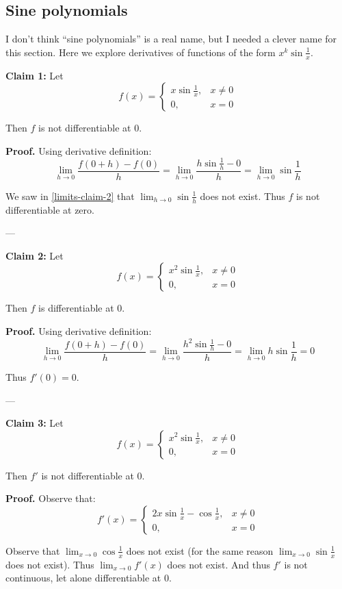 \subsection{Sine polynomials}\label{subsec-sine-poly}

I don't think ``sine polynomials'' is a real name, but I needed a
clever name for this section. Here we explore derivatives of functions
of the form $x^k\sin \frac{1}{x}$.

\vs

\textbf{Claim 1:} Let
\[f(x)=\begin{cases}
  x\sin \frac{1}{x},&x\neq0\\
  0,&x=0
\end{cases}\]

Then $f$ is not differentiable at $0$.

\vs

\textbf{Proof.} Using derivative definition:
\[\lim_{h\to0}\frac{f(0+h)-f(0)}{h}=\lim_{h\to0}\frac{h\sin
    \frac{1}{h}-0}{h}=\lim_{h\to0}\sin \frac{1}{h}\]

We saw in \ref{limits-claim-2} that $\lim_{h\to0}\sin \frac{1}{h}$ does
not exist. Thus $f$ is not differentiable at zero.

\vs---\vs

\textbf{Claim 2:} Let
\[f(x)=\begin{cases}
  x^2\sin \frac{1}{x},&x\neq0\\
  0,&x=0
\end{cases}\]

Then $f$ is differentiable at $0$.

\vs

\textbf{Proof.} Using derivative definition:
\[\lim_{h\to0}\frac{f(0+h)-f(0)}{h}=\lim_{h\to0}\frac{h^2\sin
    \frac{1}{h}-0}{h}=\lim_{h\to0}h\sin \frac{1}{h}=0\]

Thus $f'(0)=0$.

\vs---\vs

\textbf{Claim 3:} Let
\[f(x)=\begin{cases}
  x^2\sin \frac{1}{x},&x\neq0\\
  0,&x=0
\end{cases}\]

Then $f'$ is not differentiable at $0$.

\vs

\textbf{Proof.} Observe that:
\[f'(x)=\begin{cases}
  2x\sin \frac{1}{x}-\cos \frac{1}{x},&x\neq0\\
  0,&x=0
\end{cases}\]

Observe that $\lim_{x\to0}\cos \frac{1}{x}$ does not exist (for the same
reason $\lim_{x\to0}\sin \frac{1}{x}$ does not exist). Thus
$\lim_{x\to0}f'(x)$ does not exist. And thus $f'$ is not continuous, let
alone differentiable at $0$.

